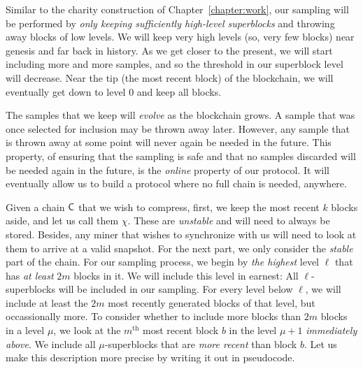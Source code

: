 Similar to the charity construction of Chapter~\ref{chapter:work},
our sampling will be performed by \emph{only keeping sufficiently high-level superblocks}
and throwing away blocks of low levels. We will keep very high levels (so, very few blocks)
near genesis and far back in history. As we get closer to the present, we will start
including more and more samples, and so the threshold in our superblock level will decrease.
Near the tip (the most recent block) of the blockchain, we will eventually get down to
level $0$ and keep all blocks.

The samples that we keep will \emph{evolve} as
the blockchain grows. A sample that was once selected for inclusion may be thrown away
later. However, any sample that is thrown away at some point will never again be needed
in the future. This property, of ensuring that the sampling is safe and that no samples
discarded will be needed again in the future, is the \emph{online} property of our
protocol. It will eventually allow us to build a protocol where no full chain is needed,
anywhere.

Given a chain $\mathsf{C}$ that we wish to compress, first, we keep the most recent $k$
blocks aside, and let us call them $\chi$.
These are \emph{unstable} and will need to always be stored.
Besides, any miner that wishes to synchronize with us will need to look at them
to arrive at a valid snapshot.
For the
next part, we only consider the \emph{stable} part of the chain.
For our sampling process, we
begin by \emph{the highest} level $\ell$ that has \emph{at least} $2m$ blocks in it.
We will include this level in earnest: All $\ell$-superblocks will be included in our
sampling. For every level below $\ell$, we will include at least the $2m$ most recently
generated blocks of that level, but occassionally more. To consider whether to include more
blocks than $2m$ blocks in a level $\mu$, we look at the $m^\text{th}$ most recent
block $b$ in the level $\mu + 1$ \emph{immediately above}. We include all $\mu$-superblocks
that are \emph{more recent} than block $b$. Let us make this description more precise
by writing it out in pseudocode.

